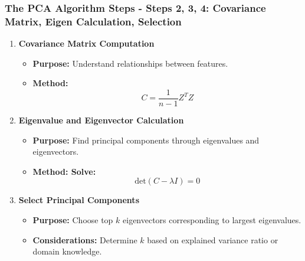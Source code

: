 \documentclass[aspectratio=169]{beamer}
\begin{document}
\begin{frame}[fragile]
    \frametitle{The PCA Algorithm Steps - Steps 2, 3, 4: Covariance Matrix, Eigen Calculation, Selection}
    \begin{enumerate}
        \item \textbf{Covariance Matrix Computation}
        \begin{itemize}
            \item \textbf{Purpose:} Understand relationships between features.
            \item \textbf{Method:}
            \begin{equation}
                C = \frac{1}{n-1} Z^T Z
            \end{equation}
        \end{itemize}

        \item \textbf{Eigenvalue and Eigenvector Calculation}
        \begin{itemize}
            \item \textbf{Purpose:} Find principal components through eigenvalues and eigenvectors.
            \item \textbf{Method: Solve:}
            \begin{equation}
                \text{det}(C - \lambda I) = 0
            \end{equation}
        \end{itemize}

        \item \textbf{Select Principal Components}
        \begin{itemize}
            \item \textbf{Purpose:} Choose top \( k \) eigenvectors corresponding to largest eigenvalues.
            \item \textbf{Considerations:} Determine \( k \) based on explained variance ratio or domain knowledge.
        \end{itemize}
    \end{enumerate}
\end{frame}
\end{document}
